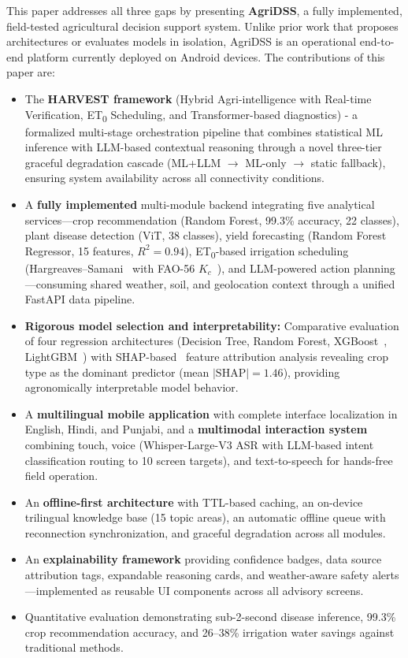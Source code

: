 \documentclass[conference]{IEEEtran}
\begin{document}
This paper addresses all three gaps by presenting \textbf{AgriDSS}, a fully implemented, field-tested agricultural decision support system. Unlike prior work that proposes architectures or evaluates models in isolation, AgriDSS is an operational end-to-end platform currently deployed on Android devices. The contributions of this paper are:

\begin{itemize}
    \item The \textbf{HARVEST framework} (Hybrid Agri-intelligence with Real-time Verification, ET\textsubscript{0} Scheduling, and Transformer-based diagnostics) - a formalized multi-stage orchestration pipeline that combines statistical ML inference with LLM-based contextual reasoning through a novel three-tier graceful degradation cascade (ML+LLM $\rightarrow$ ML-only $\rightarrow$ static fallback), ensuring system availability across all connectivity conditions.
    \item A \textbf{fully implemented} multi-module backend integrating five analytical services---crop recommendation (Random Forest, 99.3\% accuracy, 22 classes), plant disease detection (ViT, 38 classes), yield forecasting (Random Forest Regressor, 15 features, $R^2 = 0.94$), ET\textsubscript{0}-based irrigation scheduling (Hargreaves--Samani~\cite{b22} with FAO-56 $K_c$~\cite{b23}), and LLM-powered action planning---consuming shared weather, soil, and geolocation context through a unified FastAPI data pipeline.
    \item \textbf{Rigorous model selection and interpretability:} Comparative evaluation of four regression architectures (Decision Tree, Random Forest, XGBoost~\cite{b25}, LightGBM~\cite{b26}) with SHAP-based~\cite{b21} feature attribution analysis revealing crop type as the dominant predictor (mean $|\text{SHAP}| = 1.46$), providing agronomically interpretable model behavior.
    \item A \textbf{multilingual mobile application} with complete interface localization in English, Hindi, and Punjabi, and a \textbf{multimodal interaction system} combining touch, voice (Whisper-Large-V3 ASR with LLM-based intent classification routing to 10 screen targets), and text-to-speech for hands-free field operation.
    \item An \textbf{offline-first architecture} with TTL-based caching, an on-device trilingual knowledge base (15 topic areas), an automatic offline queue with reconnection synchronization, and graceful degradation across all modules.
    \item An \textbf{explainability framework} providing confidence badges, data source attribution tags, expandable reasoning cards, and weather-aware safety alerts---implemented as reusable UI components across all advisory screens.
    \item Quantitative evaluation demonstrating sub-2-second disease inference, 99.3\% crop recommendation accuracy, and 26--38\% irrigation water savings against traditional methods.
\end{itemize}
\end{document}
